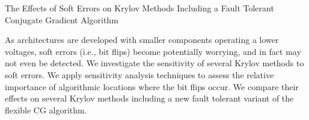 
The Effects of Soft Errors on Krylov Methods Including a Fault
Tolerant Conjugate Gradient Algorithm

As architectures are developed with smaller components
operating a lower voltages, soft errors (i.e., bit flips) become 
potentially worrying, and in fact may not even be detected. 
We investigate the sensitivity of several Krylov methods to soft errors. 
We apply sensitivity analysis techniques to assess the relative
importance of algorithmic locations where the bit flips occur.
We compare their effects on several Krylov methods including a new fault
tolerant variant of the flexible CG algorithm.

